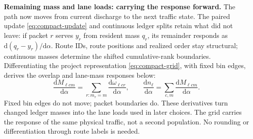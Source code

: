 \documentclass[10pt,a4paper]{article}
\begin{document}
\textbf{Remaining mass and lane loads: carrying the response forward.}
The path now moves from current discharge to the next traffic state.
The paired update \eqref{eq:compact-update} and continuous ledger splits
retain what did not leave: if packet $r$ serves $y_r$ from resident mass
$q_r$, its remainder responds as $\mathrm d(q_r-y_r)/\mathrm d\alpha$.
Route IDs, route positions and realized order stay structural; continuous
masses determine the shifted cumulative-rank boundaries.
Differentiating the project representation \eqref{eq:compact-grid}, with fixed bin edges, derives the overlap and lane-mass responses below:
\begin{equation}
 \frac{\mathrm dM_{\ell cm}}{\mathrm d\alpha}
 =\sum_{r:m_r=m}\frac{\mathrm d\omega_{\ell cr}}{\mathrm d\alpha},
 \qquad
 \frac{\mathrm dn_\ell}{\mathrm d\alpha}
 =\sum_{c,m}\frac{\mathrm dM_{\ell cm}}{\mathrm d\alpha}.
 \label{eq:compact-grid-derivative}
\end{equation}
Fixed bin edges do not move; packet boundaries do. These derivatives
turn changed ledger masses into the lane loads used in later choices.
The grid carries the response of the same physical traffic, not a second
population. No rounding or differentiation through route labels is needed.
\end{document}
